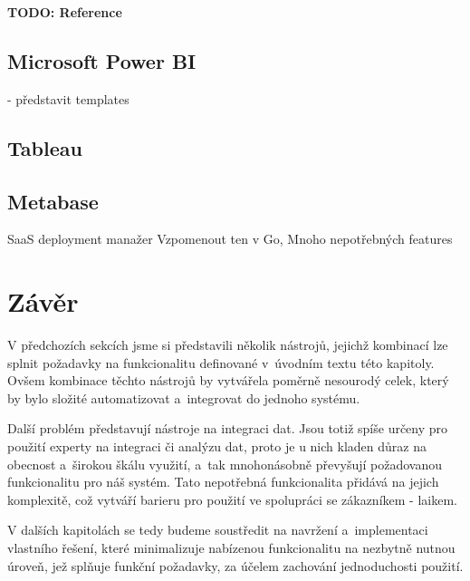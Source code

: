 \textbf{TODO: Reference}



\subsection{Microsoft Power BI}

- představit templates 



\subsection{Tableau}
\subsection{Metabase}

SaaS deployment manažer
Vzpomenout ten v Go,
Mnoho nepotřebných features

\section{Závěr}\label{sec:AnalysEnd}

V předchozích sekcích jsme si představili několik nástrojů, jejichž kombinací lze splnit požadavky na funkcionalitu definované v~úvodním textu této kapitoly. 
Ovšem kombinace těchto nástrojů by vytvářela poměrně nesourodý celek, který by bylo složité automatizovat a~integrovat do jednoho systému.

Další problém představují nástroje na integraci dat.
Jsou totiž spíše určeny pro použití experty na integraci či analýzu dat, proto je u nich kladen důraz na obecnost a~širokou škálu využití, a~tak mnohonásobně převyšují požadovanou funkcionalitu pro náš systém.
Tato nepotřebná funkcionalita přidává na jejich komplexitě, což vytváří barieru pro použití ve spolupráci se zákazníkem - laikem.

V dalších kapitolách se tedy budeme soustředit na navržení a~implementaci vlastního řešení, které minimalizuje nabízenou funkcionalitu na nezbytně nutnou úroveň, jež splňuje funkční požadavky, za účelem zachování jednoduchosti použití.










